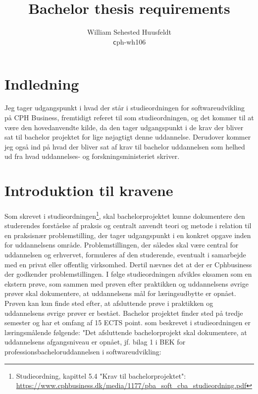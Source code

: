 \documentclass{report}
\title{Bachelor thesis requirements}
\author{
    William Sehested Huusfeldt\\
    \texttt cph-wh106
}
\date{}
\begin{document}
\maketitle
\newpage


\tableofcontents
\newpage
\section{Indledning}
Jeg tager udgangspunkt i hvad der står i studieordningen for softwareudvikling på CPH Business,
fremtidigt referet til som studieordningen, og det kommer til at være den hovedanvendte kilde,
da den tager udgangspunkt i de krav der bliver sat til bachelor projektet for lige nøjagtigt 
denne uddannelse. Derudover kommer jeg også ind på hvad der bliver sat af krav til bachelor uddannelsen
som helhed ud fra hvad uddannelses- og forskningsministeriet skriver. 

\section{Introduktion til kravene}
Som skrevet i studieordningen\footnote{Studieordning, kapittel 5.4 "Krav til bachelorprojektet": \url{https://www.cphbusiness.dk/media/1177/pba_soft_cba_studieordning.pdf}}, 
skal bachelorprojektet kunne dokumentere den studerendes forståelse af praksis og centralt
anvendt teori og metode i relation til en praksisnær problemstilling, der tager udgangspunkt i en konkret 
opgave inden for uddannelsens område. Problemstillingen, der således skal være central for 
uddannelsen og erhvervet, formuleres af den studerende, eventualt i samarbejde med en privat eller offentlig virksomhed.
Dertil nævnes det at der er Cphbusiness der godkender problemstillingen. I følge studieordningen afvikles 
eksamen som en ekstern prøve, som sammen med prøven efter praktikken og uddannelsens øvrige prøver skal dokumentere, 
at uddannelsens mål for læringsudbytte er opnået. Prøven kan kun finde sted efter, at afsluttende prøve i 
praktikken og uddannelsens øvrige prøver er bestået.
Bachelor projektet finder sted på tredje semester og har et omfang af 15 ECTS point.
som beskrevet i studieordningen er læringsmålende følgende:
"Det afsluttende bachelorprojekt skal dokumentere, at uddannelsens
afgangsniveau er opnået, jf. bilag 1 i BEK for professionsbacheloruddannelsen i
softwareudvikling:\\
\end{document}

